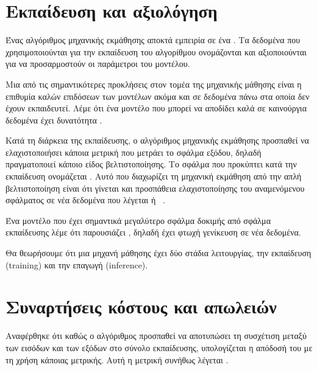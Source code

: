 \section{Εκπαίδευση και αξιολόγηση}
Ένας αλγόριθμος μηχανικής εκμάθησης αποκτά εμπειρία σε ένα .
Τα δεδομένα που χρησιμοποιούνται για την εκπαίδευση του αλγορίθμου ονομάζονται  και αξιοποιούνται για να προσαρμοστούν οι παράμετροι του μοντέλου.

Μια από τις σημαντικότερες προκλήσεις στον τομέα της μηχανικής μάθησης είναι η επιθυμία καλών επιδόσεων των μοντέλων ακόμα και σε δεδομένα πάνω στα οποία δεν έχουν εκπαιδευτεί.
Λέμε ότι ένα μοντέλο που μπορεί να αποδίδει καλά σε καινούργια δεδομένα έχει δυνατότητα .

Κατά τη διάρκεια της εκπαίδευσης, ο αλγόριθμος μηχανικής εκμάθησης προσπαθεί να ελαχιστοποιήσει κάποια μετρική που μετράει το σφάλμα εξόδου, δηλαδή πραγματοποιεί κάποιο είδος βελτιστοποίησης.
Το σφάλμα που προκύπτει κατά την εκπαίδευση ονομάζεται .
Αυτό που διαχωρίζει τη μηχανική εκμάθηση από την απλή βελτιστοποίηση είναι ότι γίνεται και προσπάθεια ελαχιστοποίησης του αναμενόμενου σφάλματος σε νέα δεδομένα που
λέγεται  ή ~\cite{Goodfellow-et-al-2016}.

Ένα μοντέλο που έχει σημαντικά μεγαλύτερο σφάλμα δοκιμής από σφάλμα εκπαίδευσης λέμε ότι παρουσιάζει ,
δηλαδή έχει φτωχή γενίκευση σε νέα δεδομένα.

Θα θεωρήσουμε ότι μια μηχανή μάθησης έχει δύο στάδια λειτουργίας, την εκπαίδευση (training) και την επαγωγή (inference).

\section{Συναρτήσεις κόστους και απωλειών}
Αναφέρθηκε ότι καθώς ο αλγόριθμος προσπαθεί να αποτυπώσει τη συσχέτιση μεταξύ των εισόδων και των εξόδων στο σύνολο εκπαίδευσης, υπολογίζεται η απόδοσή του με τη χρήση κάποιας μετρικής.
Αυτή η μετρική συνήθως λέγεται .

